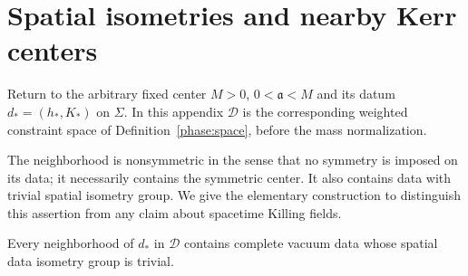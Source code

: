 \section{Spatial isometries and nearby Kerr centers}
\label{phase:symmetry}

Return to the arbitrary fixed center $M>0$, $0<\mathfrak a<M$ and
its datum $d_*=(h_*,K_*)$ on $\Sigma$. In this appendix $\mathcal D$
is the corresponding weighted constraint space of
Definition~\ref{phase:space}, before the mass normalization.

The neighborhood is nonsymmetric in the sense that no symmetry is
imposed on its data; it necessarily contains the symmetric center.
It also contains data with trivial spatial isometry group. We give
the elementary construction to distinguish this assertion from any
claim about spacetime Killing fields.

\begin{lemma}
\label{phase:trivial-isometries}
Every neighborhood of \(d_*\) in \(\mathcal D\) contains complete
vacuum data whose spatial data isometry group is trivial.
\end{lemma}

